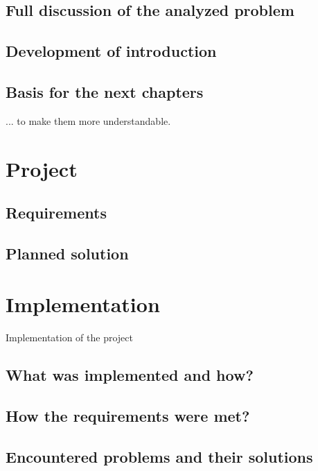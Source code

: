 \documentclass[american]{bsc}
\begin{document}
\section{Full discussion of the analyzed problem}
\label{sec:fulldisc}

\section{Development of introduction}
\label{sec:introdevelopment}

\section{Basis for the next chapters}
\label{sec:nextchapterbasis}

... to make them more understandable.

\chapter{Project}
\label{chap:project}

\section{Requirements}
\label{sec:requirements}

\section{Planned solution}
\label{sec:plan}

\chapter{Implementation}
\label{chap:implementation}

Implementation of the project

\section{What was implemented and how?}
\label{implwhat}

\section{How the requirements were met?}
\label{implrequirements}

\section{Encountered problems and their solutions}
\label{implproblems}
\end{document}
